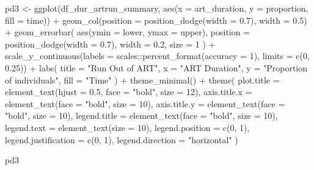 \documentclass[
  letterpaper,
  DIV=11,
  numbers=noendperiod]{scrartcl}
\newenvironment{Shaded}{\begin{snugshade}}{\end{snugshade}}
\newcommand{\AttributeTok}[1]{\textcolor[rgb]{0.40,0.45,0.13}{#1}}
\newcommand{\DecValTok}[1]{\textcolor[rgb]{0.68,0.00,0.00}{#1}}
\newcommand{\FloatTok}[1]{\textcolor[rgb]{0.68,0.00,0.00}{#1}}
\newcommand{\FunctionTok}[1]{\textcolor[rgb]{0.28,0.35,0.67}{#1}}
\newcommand{\NormalTok}[1]{\textcolor[rgb]{0.00,0.23,0.31}{#1}}
\newcommand{\OtherTok}[1]{\textcolor[rgb]{0.00,0.23,0.31}{#1}}
\newcommand{\SpecialCharTok}[1]{\textcolor[rgb]{0.37,0.37,0.37}{#1}}
\newcommand{\StringTok}[1]{\textcolor[rgb]{0.13,0.47,0.30}{#1}}
\begin{document}
\begin{Shaded}
\begin{Highlighting}[]
\NormalTok{pd3 }\OtherTok{\textless{}{-}} \FunctionTok{ggplot}\NormalTok{(df\_dur\_artrun\_summary, }\FunctionTok{aes}\NormalTok{(}\AttributeTok{x =}\NormalTok{ art\_duration, }\AttributeTok{y =}\NormalTok{ proportion, }\AttributeTok{fill =}\NormalTok{ time)) }\SpecialCharTok{+}
  \FunctionTok{geom\_col}\NormalTok{(}\AttributeTok{position =} \FunctionTok{position\_dodge}\NormalTok{(}\AttributeTok{width =} \FloatTok{0.7}\NormalTok{), }\AttributeTok{width =} \FloatTok{0.5}\NormalTok{) }\SpecialCharTok{+}
  \FunctionTok{geom\_errorbar}\NormalTok{(}
    \FunctionTok{aes}\NormalTok{(}\AttributeTok{ymin =}\NormalTok{ lower, }\AttributeTok{ymax =}\NormalTok{ upper),}
    \AttributeTok{position =} \FunctionTok{position\_dodge}\NormalTok{(}\AttributeTok{width =} \FloatTok{0.7}\NormalTok{),}
    \AttributeTok{width =} \FloatTok{0.2}\NormalTok{,}
    \AttributeTok{size =} \DecValTok{1}
\NormalTok{  ) }\SpecialCharTok{+}
  \FunctionTok{scale\_y\_continuous}\NormalTok{(}\AttributeTok{labels =}\NormalTok{ scales}\SpecialCharTok{::}\FunctionTok{percent\_format}\NormalTok{(}\AttributeTok{accuracy =} \DecValTok{1}\NormalTok{), }\AttributeTok{limits =} \FunctionTok{c}\NormalTok{(}\DecValTok{0}\NormalTok{, }\FloatTok{0.25}\NormalTok{)) }\SpecialCharTok{+}
  \FunctionTok{labs}\NormalTok{(}
    \AttributeTok{title =} \StringTok{"Run Out of ART"}\NormalTok{,}
    \AttributeTok{x =} \StringTok{"ART Duration"}\NormalTok{,}
    \AttributeTok{y =} \StringTok{"Proportion of individuals"}\NormalTok{,}
    \AttributeTok{fill =} \StringTok{"Time"}
\NormalTok{  ) }\SpecialCharTok{+}
  \FunctionTok{theme\_minimal}\NormalTok{() }\SpecialCharTok{+}
  \FunctionTok{theme}\NormalTok{(}
    \AttributeTok{plot.title =} \FunctionTok{element\_text}\NormalTok{(}\AttributeTok{hjust =} \FloatTok{0.5}\NormalTok{, }\AttributeTok{face =} \StringTok{"bold"}\NormalTok{, }\AttributeTok{size =} \DecValTok{12}\NormalTok{),}
    \AttributeTok{axis.title.x =} \FunctionTok{element\_text}\NormalTok{(}\AttributeTok{face =} \StringTok{"bold"}\NormalTok{, }\AttributeTok{size =} \DecValTok{10}\NormalTok{),}
    \AttributeTok{axis.title.y =} \FunctionTok{element\_text}\NormalTok{(}\AttributeTok{face =} \StringTok{"bold"}\NormalTok{, }\AttributeTok{size =} \DecValTok{10}\NormalTok{),}
    \AttributeTok{legend.title =} \FunctionTok{element\_text}\NormalTok{(}\AttributeTok{face =} \StringTok{"bold"}\NormalTok{, }\AttributeTok{size =} \DecValTok{10}\NormalTok{),}
    \AttributeTok{legend.text =} \FunctionTok{element\_text}\NormalTok{(}\AttributeTok{size =} \DecValTok{10}\NormalTok{),}
    \AttributeTok{legend.position =} \FunctionTok{c}\NormalTok{(}\DecValTok{0}\NormalTok{, }\DecValTok{1}\NormalTok{), }
    \AttributeTok{legend.justification =} \FunctionTok{c}\NormalTok{(}\DecValTok{0}\NormalTok{, }\DecValTok{1}\NormalTok{),}
    \AttributeTok{legend.direction =} \StringTok{"horizontal"}
\NormalTok{  )}

\NormalTok{pd3}
\end{Highlighting}
\end{Shaded}
\end{document}
